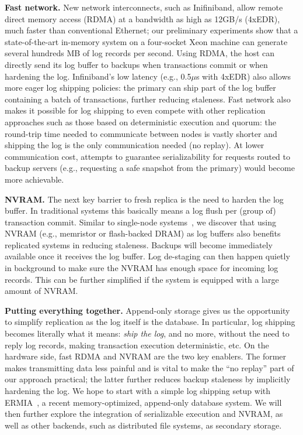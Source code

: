 \documentclass[10pt]{article}
\begin{document}
\textbf{Fast network.} New network interconnects, such as Inifiniband, allow remote direct memory access (RDMA) at a bandwidth as high as 12GB/s (4xEDR), much faster than conventional Ethernet; our preliminary experiments show that a state-of-the-art in-memory system on a four-socket Xeon machine can generate several hundreds MB of log records per second. Using RDMA, the host can directly send its log buffer to backups when transactions commit or when hardening the log. Infiniband's low latency (e.g., 0.5$\mu$s with 4xEDR) also allows more eager log shipping policies: the primary can ship part of the log buffer containing a batch of transactions, further reducing staleness. Fast network also makes it possible for log shipping to even compete with other replication approaches such as those based on deterministic execution and quorum: the round-trip time needed to communicate between nodes is vastly shorter and shipping the log is the only communication needed (no replay). At lower communication cost, attempts to guarantee serializability for requests routed to backup servers (e.g., requesting a safe snapshot from the primary) would become more achievable.

\textbf{NVRAM.} The next key barrier to fresh replica is the need to harden the log buffer. In traditional systems this basically means a log flush per (group of) transaction commit. Similar to single-node systems~\cite{NVM-DLog}, we discover that using NVRAM (e.g., memristor or flash-backed DRAM) as log buffers also benefits replicated systems in reducing staleness. Backups will become immediately available once it receives the log buffer. Log de-staging can then happen quietly in background to make sure the NVRAM has enough space for incoming log records. This can be further simplified if the system is equipped with a large amount of NVRAM.

\textbf{Putting everything together.} Append-only storage gives us the opportunity to simplify replication as the log itself is the database. In particular, log shipping becomes literally what it means: \textit{ship the log}, and no more, without the need to reply log records, making transaction execution deterministic, etc. On the hardware side, fast RDMA and NVRAM are the two key enablers. The former makes transmitting data less painful and is vital to make the ``no replay'' part of our approach practical; the latter further reduces backup staleness by implicitly hardening the log. We hope to start with a simple log shipping setup with ERMIA~\cite{ERMIA}, a recent memory-optimized, append-only database system. We will then further explore the integration of serializable execution and NVRAM, as well as other backends, such as distributed file systems, as secondary storage.
\renewcommand{\refname}{}\vspace{-12mm}

\setlength{\bibsep}{3pt plus 0ex}

\end{document}
